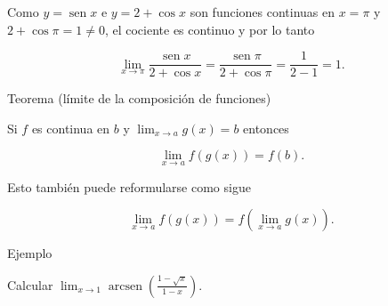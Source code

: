 \documentclass[
  letterpaper,
]{book}
\theoremstyle{plain}
\theoremstyle{remark}
\begin{document}
\begin{tcolorbox}[enhanced jigsaw, opacityback=0, left=2mm, opacitybacktitle=0.6, toprule=.15mm, bottomrule=.15mm, colbacktitle=quarto-callout-tip-color!10!white, titlerule=0mm, bottomtitle=1mm, title=\textcolor{quarto-callout-tip-color}{\faLightbulb}\hspace{0.5em}{Solución}, toptitle=1mm, colframe=quarto-callout-tip-color-frame, colback=white, breakable, rightrule=.15mm, arc=.35mm, leftrule=.75mm, coltitle=black]

Como \(y=\operatorname{sen} x\) e \(y=2+\cos x\) son funciones continuas
en \(x=\pi\) y \(2+\cos \pi =1\neq 0\), el cociente es continuo y por lo
tanto

\[
\lim_{x\to \pi} \frac{\operatorname{sen} x}{2+\cos x}=\frac{\operatorname{sen} \pi}{2+\cos \pi}=\frac{1}{2-1}=1.
\]

\end{tcolorbox}

\label{teo-limite-composicion}
Teorema (límite de la composición de funciones)

Si \(f\) es continua en \(b\) y \(\lim_{x\to a} g(x)=b\) entonces

\[
\lim_{x\to a}f(g(x))=f(b).
\]

Esto también puede reformularse como sigue

\[
\lim_{x\to a}f(g(x))=f\left(\lim_{x\to a}g(x)\right).
\]

Ejemplo

Calcular
\(\displaystyle \lim_{x\to 1} \operatorname{arcsen}\left(\frac{1-\sqrt{x}}{1-x}\right)\).
\end{document}
